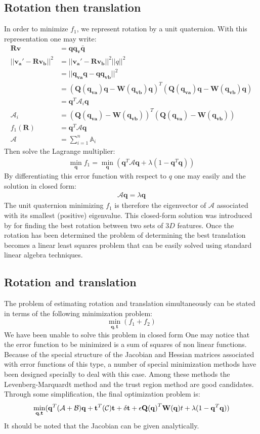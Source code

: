 \subsection{Rotation then translation}
In order to minimize $f_1$, we represent rotation by a unit quaternion. With this
representation one may write:
\begin{align}
\mathbf{R}\mathbf{v}&=\mathbf{qq_v\bar{q}} \\
||\mathbf{v_a'-Rv_b}||^2&=||\mathbf{v_a'-Rv_b}||^2||q||^2 \\
&=||\mathbf{q_{va}q-qq_{vb}}||^2 \\
&=(\mathbf{Q(q_{va})q-W(q_{vb})q})^T(\mathbf{Q(q_{va})q-W(q_{vb})q}) \\
&=\mathbf{q}^T\mathcal{A}_i\mathbf{q} \\
\mathcal{A}_i&=(\mathbf{Q(q_{va})-W(q_{vb})})^T(\mathbf{Q(q_{va})-W(q_{vb})})\\
f_1(\mathbf{R})&=\mathbf{q}^T\mathcal{A}\mathbf{q} \\
\mathcal{A}&=\sum_{i=1}^{n}\mathbb{A}_i
\end{align}
Then solve the Lagrange multiplier:
\begin{align}
\min_{\mathbf{q}} f_1=\min_{\mathbf{q}} ({\mathbf{q}}^T\mathcal{A}{\mathbf{q}}+\lambda(1-{\mathbf{q}}^T{\mathbf{q}}))
\end{align}
By differentiating this error function with respect to $q$ one may easily and the solution in closed form:
\begin{align}
\mathcal{A}\mathbf{q}=\lambda\mathbf{q}
\end{align}
The unit quaternion minimizing $f_1$ is therefore the eigenvector of $\mathcal{A}$ associated with its smallest (positive) eigenvalue. This closed-form solution was introduced by for finding the best rotation between two sets of $3D$ features.
Once the rotation has been determined the problem of determining the best translation becomes a linear least \- squares problem that can be easily solved using standard linear algebra techniques.

\subsection{Rotation and translation}
The problem of estimating rotation and translation simultaneously can be stated in terms of the following minimization problem:
$$
\min_{\mathbf{q,t}}(f_1+f_2)
$$
We have been unable to solve this problem in closed form One may notice that the error function to be minimized is a sum of squares of non linear functions. Because of the special structure of the Jacobian and Hessian matrices associated with error functions of this type, a number of special minimization methods have been designed specially to deal with this case. Among these methods the Levenberg-Marquardt 
method and the trust region method are good candidates. Through some simplification, the final optimization problem is:
$$
\min_{\mathbf{q,t}} (\mathbf{q}^T(\mathcal{A}+\mathcal{B})\mathbf{q}+
\mathbf{t}^T(\mathcal{C})\mathbf{t}+\delta\mathbf{t}+\epsilon\mathbf{Q(q)}^T\mathbf{W(q)}t+\lambda(1-\mathbf{q}^T\mathbf{q})) \\
$$
It should be noted that the Jacobian can be given analytically.


